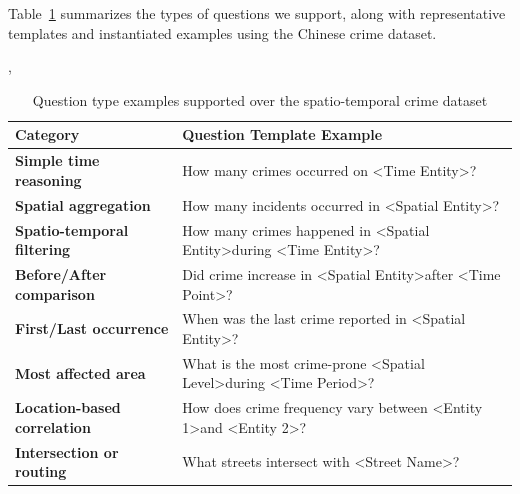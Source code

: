 Table~\ref{tab:dataset_questions} summarizes the types of questions we support, along with representative templates and instantiated examples using the Chinese crime dataset.


\cite{Unsloth2024Dataset1}, \cite{Unsloth2024WhatModel}

\begin{table}[H]
    \centering
    \caption{Question type examples supported over the spatio-temporal crime dataset}
    \label{tab:dataset_questions}
    \begin{tabular}{|p{4.5cm}|p{10cm}|}
    \hline
    \textbf{Category} & \textbf{Question Template Example} \\
    \hline
    \textbf{Simple time reasoning} & How many crimes occurred on \textless Time Entity\textgreater? \\
    \hline
    \textbf{Spatial aggregation} & How many incidents occurred in \textless Spatial Entity\textgreater? \\
    \hline
    \textbf{Spatio-temporal filtering} & How many crimes happened in \textless Spatial Entity\textgreater during \textless Time Entity\textgreater? \\
    \hline
    \textbf{Before/After comparison} & Did crime increase in \textless Spatial Entity\textgreater after \textless Time Point\textgreater? \\
    \hline
    \textbf{First/Last occurrence} & When was the last crime reported in \textless Spatial Entity\textgreater? \\
    \hline
    \textbf{Most affected area} & What is the most crime-prone \textless Spatial Level\textgreater during \textless Time Period\textgreater? \\
    \hline
    \textbf{Location-based correlation} & How does crime frequency vary between \textless Entity 1\textgreater and \textless Entity 2\textgreater? \\
    \hline
    \textbf{Intersection or routing} & What streets intersect with \textless Street Name\textgreater? \\
    \hline
    \end{tabular}
\end{table}
    



